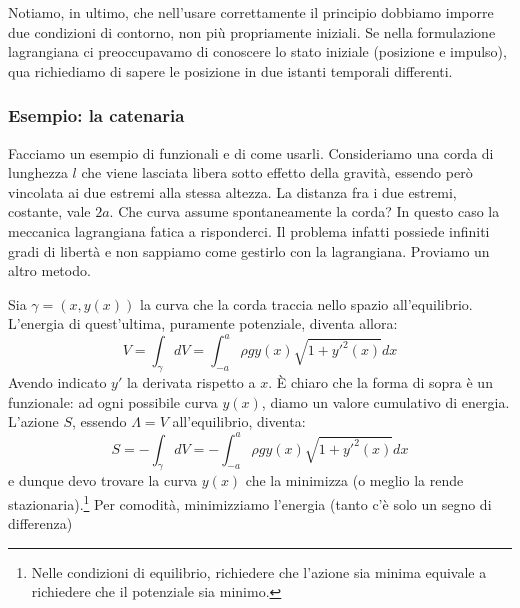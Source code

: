 \documentclass[a4paper,openany]{article}
\begin{document}
	Notiamo, in ultimo, che nell'usare correttamente il principio dobbiamo imporre due condizioni di contorno, non più propriamente iniziali. Se nella formulazione lagrangiana ci preoccupavamo di conoscere lo stato iniziale (posizione e impulso), qua richiediamo di sapere le posizione in due istanti temporali differenti.
	\subsubsection{Esempio: la catenaria}
	Facciamo un esempio di funzionali e di come usarli. Consideriamo una corda di lunghezza $l$ che viene lasciata libera sotto effetto della gravità, essendo però vincolata ai due estremi alla stessa altezza. La distanza fra i due estremi, costante, vale $2a$. Che curva assume spontaneamente la corda? In questo caso la meccanica lagrangiana fatica a risponderci. Il problema infatti possiede infiniti gradi di libertà e non sappiamo come gestirlo con la lagrangiana. Proviamo un altro metodo.
	
	Sia $\gamma = (x, y(x))$ la curva che la corda traccia nello spazio all'equilibrio. L'energia di quest'ultima, puramente potenziale, diventa allora:
	\begin{equation}\label{key}
		V = \int_{\gamma}dV = \int_{-a}^{a}\rho g y(x)\sqrt{1+y'^2(x)}dx
	\end{equation}
Avendo indicato $y'$ la derivata rispetto a $x$. È chiaro che la forma di sopra è un funzionale: ad ogni possibile curva $y(x)$, diamo un valore cumulativo di energia. L'azione $S$, essendo $\Lambda = V$ all'equilibrio, diventa:
\begin{equation}\label{key}
	S = -\int_{\gamma}dV = -\int_{-a}^{a}\rho g y(x)\sqrt{1+y'^2(x)}dx
\end{equation}
e dunque devo trovare la curva $y(x)$ che la minimizza (o meglio la rende stazionaria).\footnote{Nelle condizioni di equilibrio, richiedere che l'azione sia minima equivale a richiedere che il potenziale sia minimo.} Per comodità, minimizziamo l'energia (tanto c'è solo un segno di differenza)
\end{document}
